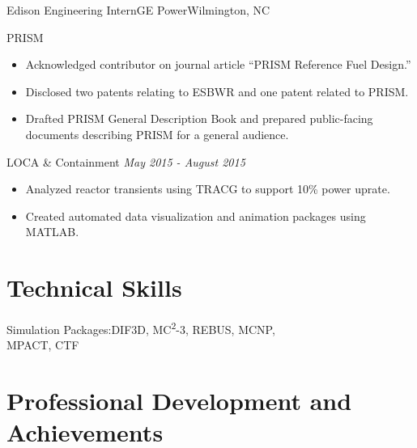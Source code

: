 \documentclass[letterpaper,11pt,nocolor,final]{moderncv}
\begin{document}
{Edison Engineering Intern}{GE Power}{Wilmington, NC}{}{
  PRISM 
  \begin{itemize}
    \item Acknowledged contributor on journal article
      ``PRISM Reference Fuel Design.''
    \item Disclosed two patents relating to ESBWR and one patent related to 
      PRISM.
    \item Drafted PRISM General Description Book and prepared public-facing
      documents describing PRISM for a general audience.
  \end{itemize}
  LOCA \& Containment \hfill \textit{May 2015 - August 2015}
  \begin{itemize}
    \item Analyzed reactor transients using TRACG to support 10\% power uprate.
    \item Created automated data visualization and animation packages using 
      MATLAB.
  \end{itemize}}



\section{Technical Skills}

{Simulation Packages:}{DIF3D, MC\textsuperscript{2}-3, REBUS, MCNP, \\
  MPACT, CTF}


\section{Professional Development and Achievements}


\end{document}

